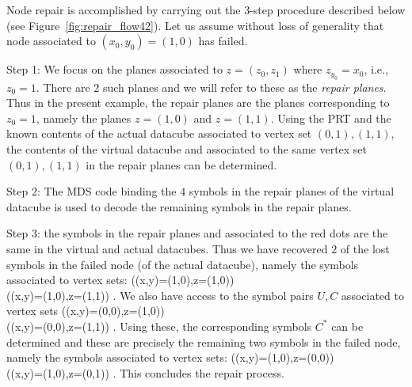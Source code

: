 \begin{multicols}{2}
 Node repair is accomplished by carrying out the $3$-step procedure described below (see Figure~\ref{fig:repair_flow42}). Let us assume without loss of generality that node associated to $(x_0,y_0)=(1,0)$ has failed.
 \bit
 \item Step 1:  We focus on the planes associated to $z=(z_0,z_1)$ where $z_{y_0}=x_0$, i.e., $z_{0}=1$. There are $2$ such planes and we will refer to these as the {\em repair planes}.  Thus in the present example, the repair planes are the planes corresponding to $z_0=1$, namely the planes $z=(1,0)$ and $z=(1,1)$.  Using the PRT and the known contents of the actual datacube associated to vertex set $(0,1),(1,1)$, the contents of the virtual datacube and associated to the same vertex set $(0,1),(1,1)$ in the repair planes can be determined.  
 \item Step 2: The MDS code binding the $4$ symbols in the repair planes of the virtual datacube is used to decode the remaining symbols in the repair planes. 
 \item Step 3: the symbols in the repair planes and associated to the red dots are the same in the virtual and actual datacubes.  Thus we have recovered $2$ of the lost symbols in the failed node (of the actual datacube), namely the symbols associated to vertex sets:
 \bean
 ((x,y)=(1,0),z=(1,0)) \\   ((x,y)=(1,0),z=(1,1)) .
 \eean
 We also have access to the symbol pairs $U,C$ associated to vertex sets 
 \bean
 ((x,y)=(0,0),z=(1,0))\\    ((x,y)=(0,0),z=(1,1)) .
 \eean
 Using these, the corresponding symbols $C^*$ can be determined and these are precisely the remaining two symbols in the failed node, namely the symbols associated to vertex sets:
 \bean
 ((x,y)=(1,0),z=(0,0))\\    ((x,y)=(1,0),z=(0,1)) .
 \eean
 This concludes the repair process. 
 \eit
 

\end{multicols}
